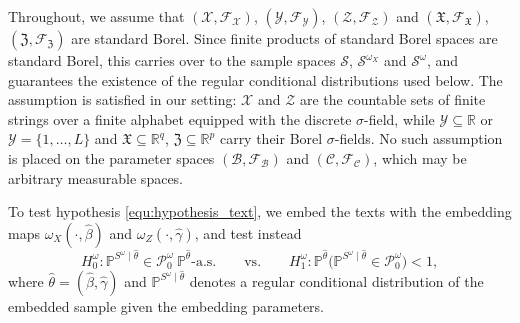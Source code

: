 \documentclass[twoside,11pt]{article}
\begin{document}
Throughout, we assume that $(\mathcal{X},\mathcal{F}_\mathcal{X})$, $(\mathcal{Y},\mathcal{F}_\mathcal{Y})$, $(\mathcal{Z},\mathcal{F}_\mathcal{Z})$ and $(\mathfrak{X},\mathcal{F}_\mathfrak{X})$, $(\mathfrak{Z},\mathcal{F}_\mathfrak{Z})$ are standard Borel. 
Since finite products of standard Borel spaces are standard Borel, this carries over to the sample spaces $\mathcal{S}$, $\mathcal{S}^{\omega_X}$ and $\mathcal{S}^{\omega}$, and guarantees the existence of the regular conditional distributions used below. 
The assumption is satisfied in our setting: $\mathcal{X}$ and $\mathcal{Z}$ are the countable sets of finite strings over a finite alphabet equipped with the discrete $\sigma$-field, while $\mathcal{Y}\subseteq\mathbb{R}$ or $\mathcal{Y}=\{1,\ldots,L\}$ and $\mathfrak{X}\subseteq\mathbb{R}^q$, $\mathfrak{Z}\subseteq\mathbb{R}^p$ carry their Borel $\sigma$-fields. 
No such assumption is placed on the parameter spaces $(\mathcal{B},\mathcal{F}_\mathcal{B})$ and $(\mathcal{C},\mathcal{F}_\mathcal{C})$, which may be arbitrary measurable spaces.


To test hypothesis \eqref{equ:hypothesis_text}, we embed the texts with the embedding maps $\omega_X(\cdot,\hat\beta)$ and $\omega_Z(\cdot,\hat\gamma)$, and test instead
\begin{equation}\label{equ:hypothesis_embedding}
H^\omega_0 : \mathbb{P}^{S^\omega\mid\hat\theta}\in\mathcal{P}^\omega_0\
\mathbb{P}^{\hat\theta}\text{-a.s.}
\qquad\text{vs.}\qquad
H^\omega_1 : \mathbb{P}^{\hat\theta}\bigl(\mathbb{P}^{S^\omega\mid\hat\theta}
\in\mathcal{P}^\omega_0\bigr)<1,
\end{equation}
where $\hat\theta=(\hat\beta,\hat\gamma)$ and $\mathbb{P}^{S^\omega\mid\hat\theta}$ denotes a regular conditional distribution of the embedded sample given the embedding parameters. 
\end{document}
